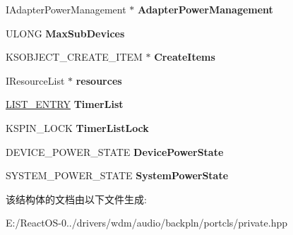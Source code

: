 \begin{DoxyCompactItemize}
I\+Adapter\+Power\+Management $\ast$ {\bfseries Adapter\+Power\+Management}
\item 
\mbox{\label{struct_p_c_l_a_s_s___d_e_v_i_c_e___e_x_t_e_n_s_i_o_n_aea093b8c2ff5d5a167e3dbfbfbd5dfa4}} 
U\+L\+O\+NG {\bfseries Max\+Sub\+Devices}
\item 
\mbox{\label{struct_p_c_l_a_s_s___d_e_v_i_c_e___e_x_t_e_n_s_i_o_n_abd46ef690aeebf7696b4af9b031b0ad2}} 
K\+S\+O\+B\+J\+E\+C\+T\+\_\+\+C\+R\+E\+A\+T\+E\+\_\+\+I\+T\+EM $\ast$ {\bfseries Create\+Items}
\item 
\mbox{\label{struct_p_c_l_a_s_s___d_e_v_i_c_e___e_x_t_e_n_s_i_o_n_a03021171b00419bd7c17ea20f29972ad}} 
I\+Resource\+List $\ast$ {\bfseries resources}
\item 
\mbox{\label{struct_p_c_l_a_s_s___d_e_v_i_c_e___e_x_t_e_n_s_i_o_n_a359a8ab153493eb7f7c39fb1edc7f37f}} 
\hyperlink{struct___l_i_s_t___e_n_t_r_y}{L\+I\+S\+T\+\_\+\+E\+N\+T\+RY} {\bfseries Timer\+List}
\item 
\mbox{\label{struct_p_c_l_a_s_s___d_e_v_i_c_e___e_x_t_e_n_s_i_o_n_af8057198ec8a316bd5efe7982ddd3a8e}} 
K\+S\+P\+I\+N\+\_\+\+L\+O\+CK {\bfseries Timer\+List\+Lock}
\item 
\mbox{\label{struct_p_c_l_a_s_s___d_e_v_i_c_e___e_x_t_e_n_s_i_o_n_ae882e9e541fc6f843ecc9d9f80ea7755}} 
D\+E\+V\+I\+C\+E\+\_\+\+P\+O\+W\+E\+R\+\_\+\+S\+T\+A\+TE {\bfseries Device\+Power\+State}
\item 
\mbox{\label{struct_p_c_l_a_s_s___d_e_v_i_c_e___e_x_t_e_n_s_i_o_n_a52f0b0d0e8ec7aab705afcc1ae7d0252}} 
S\+Y\+S\+T\+E\+M\+\_\+\+P\+O\+W\+E\+R\+\_\+\+S\+T\+A\+TE {\bfseries System\+Power\+State}
\end{DoxyCompactItemize}


该结构体的文档由以下文件生成\+:\begin{DoxyCompactItemize}
\item 
E\+:/\+React\+O\+S-\/0../drivers/wdm/audio/backpln/portcls/private.\+hpp\end{DoxyCompactItemize}

